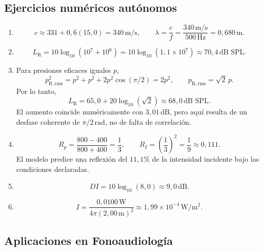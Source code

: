 \subsection*{Ejercicios numéricos autónomos}

\begin{enumerate}[label=\textbf{N\arabic*.},leftmargin=*]
    \item
    \[
        c\approx331+0{,}6(15{,}0)
          =340\,\text{m}/\text{s},
        \qquad
        \lambda=\frac{c}{f}
          =\frac{340\,\text{m}/\text{s}}{500\,\text{Hz}}
          =0{,}680\,\text{m}.
    \]

    \item
    \[
        L_\mathrm{R}
          =10\log_{10}\!\left(10^7+10^6\right)
          =10\log_{10}(1{,}1\times10^7)
          \approx70{,}4\,\text{dB SPL}.
    \]

    \item Para presiones eficaces iguales \(p\),
    \[
        p_\mathrm{R,rms}^2
          =p^2+p^2+2p^2\cos(\pi/2)
          =2p^2,
        \qquad
        p_\mathrm{R,rms}=\sqrt{2}\,p.
    \]
    Por lo tanto,
    \[
        L_\mathrm{R}
          =65{,}0+20\log_{10}(\sqrt{2})
          \approx68{,}0\,\text{dB SPL}.
    \]
    El aumento coincide numéricamente con \(3{,}01\,\text{dB}\), pero aquí
    resulta de un desfase coherente de \(\pi/2\,\text{rad}\), no de falta de
    correlación.

    \item
    \[
        R_p=\frac{800-400}{800+400}=\frac{1}{3},
        \qquad
        R_I=\left(\frac{1}{3}\right)^2=\frac{1}{9}\approx0{,}111.
    \]
    El modelo predice una reflexión del \(11{,}1\%\) de la intensidad
    incidente bajo las condiciones declaradas.

    \item
    \[
        DI=10\log_{10}(8{,}0)\approx9{,}0\,\text{dB}.
    \]

    \item
    \[
        I=\frac{0{,}0100\,\text{W}}
                {4\pi(2{,}00\,\text{m})^2}
          \approx1{,}99\times10^{-4}\,\text{W}/\text{m}^2.
    \]
\end{enumerate}

\subsection*{Aplicaciones en Fonoaudiología}


